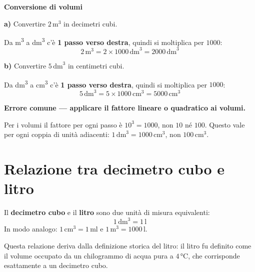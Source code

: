 \begin{esempio}
    \textbf{Conversione di volumi}

    \medskip
    \textbf{a)} Convertire $2\,\text{m}^3$ in decimetri cubi.

    Da m\textsuperscript{3} a dm\textsuperscript{3} c'è \textbf{1 passo verso destra}, quindi si moltiplica per $1000$:
    \[
        2\,\text{m}^3 = 2 \times 1000\,\text{dm}^3 = 2000\,\text{dm}^3
    \]

    \medskip
    \textbf{b)} Convertire $5\,\text{dm}^3$ in centimetri cubi.

    Da dm\textsuperscript{3} a cm\textsuperscript{3} c'è \textbf{1 passo verso destra}, quindi si moltiplica per $1000$:
    \[
        5\,\text{dm}^3 = 5 \times 1000\,\text{cm}^3 = 5000\,\text{cm}^3
    \]
\end{esempio}

\begin{attenzione}
    \textbf{Errore comune — applicare il fattore lineare o quadratico ai volumi.}

    Per i volumi il fattore per ogni passo è $10^3 = 1000$, non $10$ né $100$. Questo vale per ogni coppia di unità adiacenti: $1\,\text{dm}^3 = 1000\,\text{cm}^3$, non $100\,\text{cm}^3$.
\end{attenzione}

\section{Relazione tra decimetro cubo e litro}

\begin{definizione}
    Il \textbf{decimetro cubo} e il \textbf{litro} sono due unità di misura equivalenti:
    \[
        \boxed{1\,\text{dm}^3 = 1\,\text{l}}
    \]
    In modo analogo: $1\,\text{cm}^3 = 1\,\text{ml}$ e $1\,\text{m}^3 = 1000\,\text{l}$.
\end{definizione}

Questa relazione deriva dalla definizione storica del litro: il litro fu definito come il volume occupato da un chilogrammo di acqua pura a $4\,°\text{C}$, che corrisponde esattamente a un decimetro cubo.

